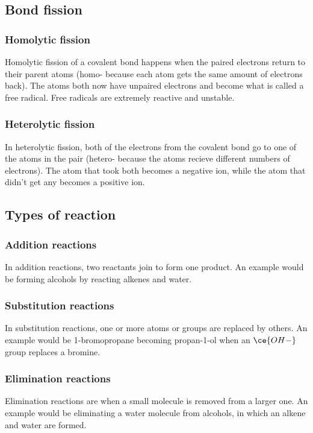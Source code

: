 \subsection{Bond fission}
\subsubsection{Homolytic fission}
Homolytic fission of a covalent bond happens when the paired electrons return to their parent atoms (homo- because each atom gets the same amount of electrons back). The atoms both now have unpaired electrons and become what is called a free radical. Free radicals are extremely reactive and unstable.

\subsubsection{Heterolytic fission}
In heterolytic fission, both of the electrons from the covalent bond go to one of the atoms in the pair (hetero- because the atoms recieve different numbers of electrons). The atom that took both becomes a negative ion, while the atom that didn't get any becomes a positive ion.

\subsection{Types of reaction}
\subsubsection{Addition reactions}
In addition reactions, two reactants join to form one product. An example would be forming alcohols by reacting alkenes and water.

\subsubsection{Substitution reactions}
In substitution reactions, one or more atoms or groups are replaced by others. An example would be 1-bromopropane becoming propan-1-ol when an $\ce{OH-}$ group replaces a bromine.

\subsubsection{Elimination reactions}
Elimination reactions are when a small molecule is removed from a larger one. An example would be eliminating a water molecule from alcohols, in which an alkene and water are formed.

